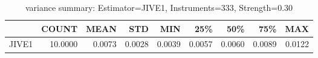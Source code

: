 \begin{table}[ht]
\centering
\caption{variance summary: Estimator=JIVE1, Instruments=333, Strength=0.30}
\begin{tabular}{lrrrrrrrr}
\toprule
 & COUNT & MEAN & STD & MIN & 25\% & 50\% & 75\% & MAX \\
\midrule
JIVE1 & 10.0000 & 0.0073 & 0.0028 & 0.0039 & 0.0057 & 0.0060 & 0.0089 & 0.0122 \\
\bottomrule
\end{tabular}
\end{table}
